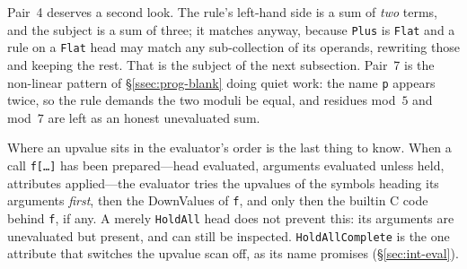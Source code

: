 \begin{codepairs}
\end{codepairs}

Pair~4 deserves a second look. The rule's left-hand side is a sum of
\emph{two} terms, and the subject is a sum of three; it matches anyway, because
\texttt{Plus} is \texttt{Flat} and a rule on a \texttt{Flat} head may match any
sub-collection of its operands, rewriting those and keeping the rest. That is
the subject of the next subsection. Pair~7 is the non-linear pattern of
\S\ref{ssec:prog-blank} doing quiet work: the name \texttt{p} appears twice, so the
rule demands the two moduli be equal, and residues mod~\(5\) and mod~\(7\) are left
as an honest unevaluated sum.

Where an upvalue sits in the evaluator's order is the last thing to know. When a
call \texttt{f[\ldots]} has been prepared---head evaluated, arguments evaluated
unless held, attributes applied---the evaluator tries the upvalues of the symbols
heading its arguments \emph{first}, then the DownValues of \texttt{f}, and only then
the builtin C code behind \texttt{f}, if any. A
merely \texttt{HoldAll} head does not prevent this: its arguments are unevaluated but
present, and can still be inspected. \texttt{HoldAllComplete} is the one attribute
that switches the upvalue scan off, as its name promises (\S\ref{sec:int-eval}).

